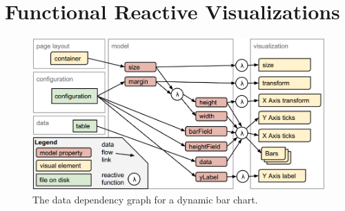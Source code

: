 \section{Functional Reactive Visualizations}
\begin{figure}[h]
  \caption{The data dependency graph for a dynamic bar chart.}
  \centering
  \includegraphics[width=\textwidth]{figures/barChartFlow.png}
\end{figure}
